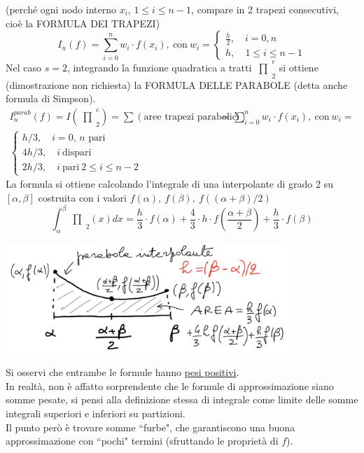 \documentclass[12pt,a4paper]{article}
\newcommand{\inter}{\begin{matrix}\prod\end{matrix}}
\begin{document}
(perché ogni nodo interno $x_i$, $1 \leq i \leq n-1$, compare in 2 trapezi consecutivi, cioè la FORMULA DEI TRAPEZI)
\[
I_n (f) = \sum_{i=0}^n w_i \cdot f(x_i), \ \text{con} \ w_i =
\begin{cases}
\frac{h}{2}, \quad i=0,n \\
h, \quad 1 \le i \le n-1
\end{cases}
\]
Nel caso $s=2$, integrando la funzione quadratica a tratti $\inter_2^c$ si ottiene (dimostrazione non richiesta) la FORMULA DELLE PARABOLE (detta anche formula di Simpson).
\[
\begin{split}
I_n^{parab} (f) = I \left(\inter_2^c\right) = \sum (\text{aree trapezi parabolici}) 
& = \sum_{i=0}^n w_i \cdot f(x_i), \ \text{con} \ w_i = \\
\begin{cases}
h/3,  \quad i=0, \, n \text { pari}\\
4h/3, \quad i \ \text{dispari}\\
2h/3, \quad i \ \text{pari} \ 2 \leq i \leq n-2
\end{cases}
\end{split}
\]
La formula si ottiene calcolando l'integrale di una interpolante di grado 2 su $[\alpha, \beta]$ costruita con i valori $f(\alpha), \ f(\beta), \ f((\alpha+\beta)/2)$
\[
\int_\alpha^\beta \inter_2 (x) dx = \frac{h}{3} \cdot f(\alpha) + \frac{4}{3} \cdot h \cdot f\left(\frac{\alpha + \beta}{2}\right) + \frac{h}{3} \cdot f(\beta)
\]
\begin{center}
    \includegraphics[width=0.8\textwidth]{pag21.png}
\end{center}
Si osservi che entrambe le formule hanno \uline{pesi positivi}.\\
In realtà, non è affatto sorprendente che le formule di approssimazione siano somme pesate, si pensi alla definizione stessa di integrale come limite delle somme integrali superiori e inferiori su partizioni.\\
Il punto però è trovare somme ``furbe", che garantiscono una buona approssimazione con ``pochi" termini (sfruttando le proprietà di $f$).
\end{document}
